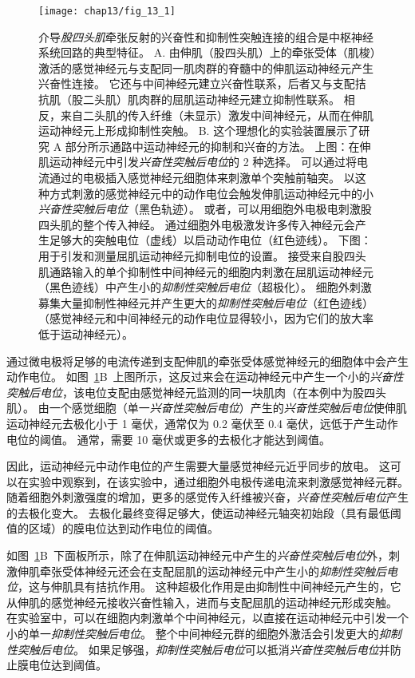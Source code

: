 \begin{figure}[htbp]
	\centering
	\texttt{[image: chap13/fig\_13\_1]}
	\caption{介导\textit{股四头肌}牵张反射的兴奋性和抑制性突触连接的组合是中枢神经系统回路的典型特征。
		A. 由伸肌（股四头肌）上的牵张受体（肌梭）激活的感觉神经元与支配同一肌肉群的脊髓中的伸肌运动神经元产生兴奋性连接。
		它还与中间神经元建立兴奋性联系，后者又与支配拮抗肌（股二头肌）肌肉群的屈肌运动神经元建立抑制性联系。
		相反，来自二头肌的传入纤维（未显示）激发中间神经元，从而在伸肌运动神经元上形成抑制性突触。
		B. 这个理想化的实验装置展示了研究 A 部分所示通路中运动神经元的抑制和兴奋的方法。
		上图：在伸肌运动神经元中引发\textit{兴奋性突触后电位}的 2 种选择。
		可以通过将电流通过的电极插入感觉神经元细胞体来刺激单个突触前轴突。
		以这种方式刺激的感觉神经元中的动作电位会触发伸肌运动神经元中的小\textit{兴奋性突触后电位}（黑色轨迹）。
		或者，可以用细胞外电极电刺激股四头肌的整个传入神经。
		通过细胞外电极激发许多传入神经元会产生足够大的突触电位（虚线）以启动动作电位（红色迹线）。
		下图：用于引发和测量屈肌运动神经元抑制电位的设置。
		接受来自股四头肌通路输入的单个抑制性中间神经元的细胞内刺激在屈肌运动神经元（黑色迹线）中产生小的\textit{抑制性突触后电位}（超极化）。
		细胞外刺激募集大量抑制性神经元并产生更大的\textit{抑制性突触后电位}（红色迹线）
		（感觉神经元和中间神经元的动作电位显得较小，因为它们的放大率低于运动神经元）。}
	\label{fig:13_1}
\end{figure}


通过微电极将足够的电流传递到支配伸肌的牵张受体感觉神经元的细胞体中会产生动作电位。
如图~\ref{fig:13_1}B~上图所示，这反过来会在运动神经元中产生一个小的\textit{兴奋性突触后电位}，该电位支配由感觉神经元监测的同一块肌肉（在本例中为股四头肌）。
由一个感觉细胞（单一\textit{兴奋性突触后电位}）产生的\textit{兴奋性突触后电位}使伸肌运动神经元去极化小于 1 毫伏，通常仅为 0.2 毫伏至 0.4 毫伏，远低于产生动作电位的阈值。
通常，需要 10 毫伏或更多的去极化才能达到阈值。


因此，运动神经元中动作电位的产生需要大量感觉神经元近乎同步的放电。
这可以在实验中观察到，在该实验中，通过细胞外电极传递电流来刺激感觉神经元群。
随着细胞外刺激强度的增加，更多的感觉传入纤维被兴奋，\textit{兴奋性突触后电位}产生的去极化变大。
去极化最终变得足够大，使运动神经元轴突初始段（具有最低阈值的区域）的膜电位达到动作电位的阈值。


如图~\ref{fig:13_1}B~下面板所示，除了在伸肌运动神经元中产生的\textit{兴奋性突触后电位}外，刺激伸肌牵张受体神经元还会在支配屈肌的运动神经元中产生小的\textit{抑制性突触后电位}，这与伸肌具有拮抗作用。
这种超极化作用是由抑制性中间神经元产生的，它从伸肌的感觉神经元接收兴奋性输入，进而与支配屈肌的运动神经元形成突触。
在实验室中，可以在细胞内刺激单个中间神经元，以直接在运动神经元中引发一个小的单一\textit{抑制性突触后电位}。
整个中间神经元群的细胞外激活会引发更大的\textit{抑制性突触后电位}。
如果足够强，\textit{抑制性突触后电位}可以抵消\textit{兴奋性突触后电位}并防止膜电位达到阈值。



